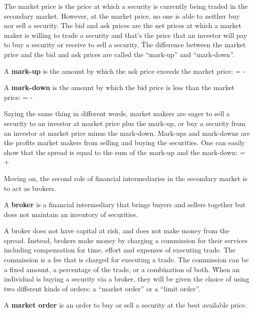 The market price is the price at which a security is currently being traded in the secondary market. However, at the
market price, no one is able to neither buy nor sell a security. The bid and ask prices are the net prices at which a
market maker is willing to trade a security and that's the price that an investor will pay to buy a security or receive
to sell a security. \v

The difference between the market price and the bid and ask prices are called the ``mark-up'' and ``mark-down''.

\bd[Mark-Up]
A \textbf{mark-up} is the amount by which the ask price exceeds the market price:
\bse
{} =  - 
\ese
\ed

A \textbf{mark-down} is the amount by which the bid price is less than the market price:
\bse
{} =  - 
\ese
\ed

Saying the same thing in different words, market makers are eager to sell a security to an investor at market price
plus the mark-up, or buy a security from an investor at market price minus the mark-down. Mark-ups and mark-downs are
the profits market makers from selling and buying the securities. One can easily show that the spread is equal to the
sum of the mark-up and the mark-down:
\bse
{} =  + 
\ese

Moving on, the second role of financial intermediaries in the secondary market is to act as brokers.

\bd[Broker]
A \textbf{broker} is a financial intermediary that brings buyers and sellers together but does not maintain an
inventory of securities.
\ed

A broker does not have capital at risk, and does not make money from the spread. Instead, brokers make money by
charging a commission for their services including compensation for time, effort and expenses of executing trade. The
commission is a fee that is charged for executing a trade. The commission can be a fixed amount, a percentage of the
trade, or a combination of both. \v

When an individual is buying a security via a broker, they will be given the choice of using two different kinds of
orders: a ``market order'' or a ``limit order''.

A \textbf{market order} is an order to buy or sell a security at the best available price.
\ed

